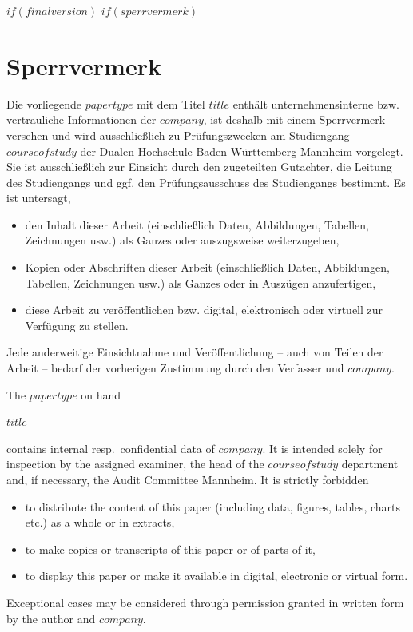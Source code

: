 \documentclass[
	$if(lang)$$babel-lang$,$endif$$if(fontsize)$$fontsize$,$else$12pt,$endif$ %
	$if(lang)$$babel-lang$,$endif$oneside,			%
	pagesize,
	$if(papersize)$paper=$papersize$,$else$paper=a4,$endif$
	parskip=half,		%
	headheight = 18pt,	%
	headsepline,		%
	footsepline,		%
	footheight = 18pt,	%
	abstract=true,		%
	DIV=calc,		%
	BCOR=8mm,		%
	headinclude=false,	%
	footinclude=false,	%
	toc=bibliography,	%
]{scrbook}	%
\newcommand{\dhbw}{Mannheim}
\begin{document}
	$if(finalversion)$
	$if(sperrvermerk)$ %
	{
		\thispagestyle{empty}
		\section{Sperrvermerk}


		\vspace*{2em}

		\begin{de}
		Die vorliegende {$papertype$} mit dem Titel {\itshape{} $title${}\/} enthält unternehmensinterne bzw. vertrauliche Informationen der {$company$}, ist deshalb mit einem Sperrvermerk versehen und wird ausschließlich zu Prüfungszwecken am Studiengang {$courseofstudy$} der Dualen Hochschule Baden-Württemberg {\dhbw} vorgelegt. Sie ist ausschließlich zur Einsicht durch den zugeteilten Gutachter, die Leitung des Studiengangs und ggf. den Prüfungsausschuss des Studiengangs bestimmt.  Es ist untersagt,
		\begin{itemize}
		\item den Inhalt dieser Arbeit (einschließlich Daten, Abbildungen, Tabellen, Zeichnungen usw.) als Ganzes oder auszugsweise weiterzugeben,
		\item Kopien oder Abschriften dieser Arbeit (einschließlich Daten, Abbildungen, Tabellen, Zeichnungen usw.) als Ganzes oder in Auszügen anzufertigen,
		\item diese Arbeit zu veröffentlichen bzw. digital, elektronisch oder virtuell zur Verfügung zu stellen.
		\end{itemize}
		Jede anderweitige Einsichtnahme und Veröffentlichung – auch von Teilen der Arbeit – bedarf der vorherigen Zustimmung durch den Verfasser und {$company$}.
		\end{de}

		\begin{en}%
		The {$papertype$} on hand
		\begin{center}{\itshape{} $title$\/}\end{center}
		 contains internal resp.\ confidential data of $company$. It is intended solely for inspection by the assigned examiner, the head of the {$courseofstudy$} department and, if necessary, the Audit Committee \langanderdh{} {\dhbw}. It is strictly forbidden
			\begin{itemize}
			\item to distribute the content of this paper (including data, figures, tables, charts etc.) as a whole or in extracts,
			\item to make copies or transcripts of this paper or of parts of it,
			\item to display this paper or make it available in digital, electronic or virtual form.
			\end{itemize}
		Exceptional cases may be considered through permission granted in written form by the author and {$company$}.
		\end{en}

}
\end{document}
